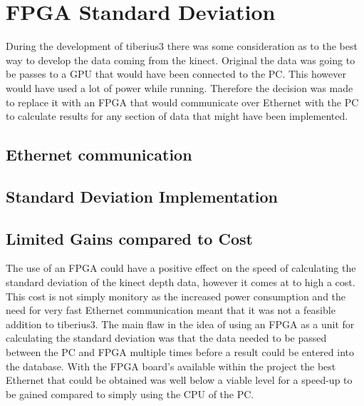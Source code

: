 \section{FPGA Standard Deviation}
During the development of \gls{tiberius3} there was some consideration as to the best way to develop the data coming from the kinect. Original the data was going to be passes to a GPU that would have been connected to the PC. This however would have used a lot of power while running. Therefore the decision was made to replace it with an \gls{FPGA} that would communicate over Ethernet with the PC to calculate results for any section of data that might have been implemented. 
\subsection{Ethernet communication}

\subsection{Standard Deviation Implementation}

\subsection{Limited Gains compared to Cost}
The use of an \gls{FPGA} could have a positive effect on the speed of calculating the standard deviation of the kinect depth data, however it comes at to high a cost. This cost is not simply monitory as the increased power consumption and the need for very fast Ethernet communication meant that it was not a feasible addition to \gls{tiberius3}. The main flaw in the idea of using an \gls{FPGA} as a unit for calculating the standard deviation was that the data needed to be passed between the PC and \gls{FPGA} multiple times before a result could be entered into the database. With the \gls{FPGA} board's available within the project the best Ethernet that could be obtained was well below a viable level for a speed-up to be gained compared to simply using the CPU of the PC.

\pagestyle{stuart}













